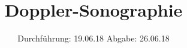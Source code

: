 

\subject{US3}
\title{Doppler-Sonographie}
\date{
  Durchführung: 19.06.18
  \hspace{3em}
  Abgabe: 26.06.18
}



\maketitle
\thispagestyle{empty}
\tableofcontents
\newpage









\newpage
\printbibliography


